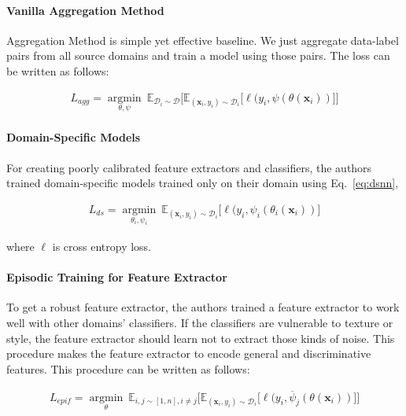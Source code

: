 \documentclass[10pt,twocolumn,letterpaper]{article}
\begin{document}
\vspace{-0.2cm}
\paragraph{Vanilla Aggregation Method}
Aggregation Method is simple yet effective baseline. We just aggregate data-label pairs from all source domains and train a model using those pairs. The loss can be written as follows:

\begin{equation}
\label{eq:agg}
\begin{aligned}
L_{agg} = \underset{\theta, \psi}{\operatorname{argmin}}~ \mathbb{E}_{\mathcal{D}_i\sim\mathcal{D}} \big[ \mathbb{E}_{(\mathbf{x}_i,y_i)\sim \mathcal{D}_i} \big[  \ell(y_i, \psi (\theta(\mathbf{x}_i)) \big] \big]
\end{aligned}
\end{equation}

\vspace{-0.4cm}
\paragraph{Domain-Specific Models} For creating poorly calibrated feature extractors and classifiers, the authors trained domain-specific models trained only on their domain using Eq.~\ref{eq:dsnn},

\begin{equation}
\label{eq:dsnn}
\begin{aligned}
L_{ds} = \underset{\theta_i, \psi_i}{\operatorname{argmin}}~  \mathbb{E}_{(\mathbf{x}_i, y_i)\sim \mathcal{D}_i} \big[  \ell(y_i, \psi_i (\theta_i(\mathbf{x}_i)) \big]
\end{aligned}
\end{equation}

where $\ell$ is cross entropy loss.

\paragraph{Episodic Training for Feature Extractor}
To get a robust feature extractor, the authors trained a feature extractor to work well with other domains' classifiers. If the classifiers are vulnerable to texture or style, the feature extractor should learn not to extract those kinds of noise. This procedure makes the feature extractor to encode general and discriminative features. This procedure can be written as follows:

\begin{equation}
\begin{aligned}
\label{eq:agg-reg-feat}
L_{epif} = \underset{\theta}{\operatorname{argmin}}~
\mathbb{E}_{i,j\sim[1,n], i\neq j} \big[ \mathbb{E}_{(\mathbf{x}_i,y_i)\sim \mathcal{D}_i} \big[  \ell(y_i, \overline{\psi}_j(\theta(\mathbf{x}_i)) \big] \big]
\end{aligned}
\end{equation}
\end{document}
